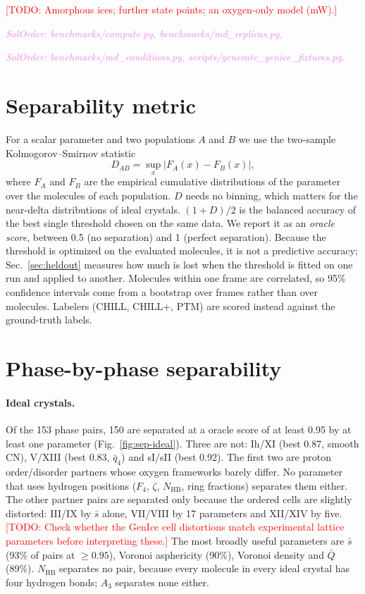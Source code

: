 \documentclass{template1}
\newcommand{\code}[1]{\par\noindent\textcolor{violet}{\textit{SolOrder: #1}}\par}
\newcommand{\todo}[1]{\textcolor{red}{[TODO: #1]}}
\begin{document}
\todo{Amorphous ices; further state points; an oxygen-only model (mW).}
\code{benchmarks/compute.py, benchmarks/md\_replicas.py,}
\code{benchmarks/md\_conditions.py, scripts/generate\_genice\_fixtures.py.}

\section{Separability metric}
For a scalar parameter and two populations $A$ and $B$ we use the
two-sample Kolmogorov--Smirnov statistic
\begin{equation}
  D_{AB} = \sup_x \left| F_A(x) - F_B(x) \right| ,
\end{equation}
where $F_A$ and $F_B$ are the empirical cumulative distributions of the
parameter over the molecules of each population. $D$ needs no binning, which
matters for the near-delta distributions of ideal crystals. $(1+D)/2$ is
the balanced accuracy of the best single threshold chosen on the same data.
We report it as an \emph{oracle score}, between 0.5 (no separation) and 1
(perfect separation). Because the threshold is optimized on the evaluated
molecules, it is not a predictive accuracy; Sec.~\ref{sec:heldout} measures
how much is lost when the threshold is fitted on one run and applied to
another.
Molecules within one frame are correlated, so 95\% confidence intervals come
from a bootstrap over frames rather than over molecules. Labelers (CHILL,
CHILL+, PTM) are scored instead against the ground-truth labels.

\section{Phase-by-phase separability}
\paragraph{Ideal crystals.} Of the 153 phase pairs, 150 are separated at a
oracle score of at least 0.95 by at least one parameter
(Fig.~\ref{fig:sep-ideal}). Three are not: Ih/XI (best 0.87, smooth CN),
V/XIII (best 0.83, $\bar q_4$) and sI/sII (best 0.92). The first two are
proton order/disorder partners whose oxygen frameworks barely differ. No
parameter that uses hydrogen positions ($F_4$, $\zeta$, $N_\mathrm{HB}$, ring
fractions) separates them either. The other partner pairs are separated only
because the ordered cells are slightly distorted: III/IX by $\bar s$ alone,
VII/VIII by 17 parameters and XII/XIV by five. \todo{Check whether the GenIce
cell distortions match experimental lattice parameters before interpreting
these.} The most broadly useful parameters are $\bar s$ (93\% of pairs at
$\ge 0.95$), Voronoi asphericity (90\%), Voronoi density and $\bar Q$ (89\%).
$N_\mathrm{HB}$ separates no pair, because every molecule in every ideal
crystal has four hydrogen bonds; $A_3$ separates none either.
\end{document}
